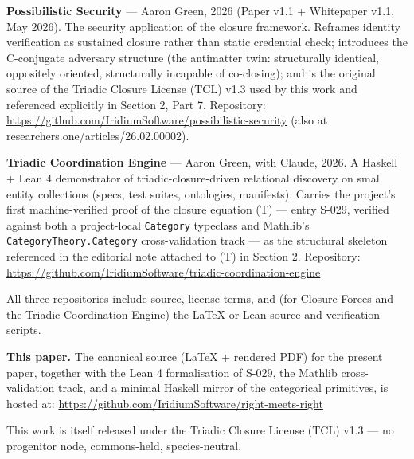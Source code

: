 \documentclass[
]{article}
\begin{document}
\textbf{Possibilistic Security} --- Aaron Green, 2026 (Paper v1.1
+ Whitepaper v1.1, May 2026). The security application of the
closure framework. Reframes identity verification as sustained
closure rather than static credential check; introduces the
C-conjugate adversary structure (the antimatter twin: structurally
identical, oppositely oriented, structurally incapable of
co-closing); and is the original source of the Triadic Closure
License (TCL) v1.3 used by this work and referenced explicitly in
Section 2, Part 7. Repository:
\url{https://github.com/IridiumSoftware/possibilistic-security}
(also at researchers.one/articles/26.02.00002).

\textbf{Triadic Coordination Engine} --- Aaron Green, with Claude,
2026. A Haskell + Lean 4 demonstrator of triadic-closure-driven
relational discovery on small entity collections (specs, test
suites, ontologies, manifests). Carries the project's first
machine-verified proof of the closure equation (T) --- entry
S-029, verified against both a project-local \texttt{Category}
typeclass and Mathlib's \texttt{CategoryTheory.Category}
cross-validation track --- as the structural skeleton referenced in
the editorial note attached to (T) in Section 2. Repository:
\url{https://github.com/IridiumSoftware/triadic-coordination-engine}

All three repositories include source, license terms, and (for
Closure Forces and the Triadic Coordination Engine) the LaTeX or
Lean source and verification scripts.

\textbf{This paper.} The canonical source (LaTeX + rendered PDF) for
the present paper, together with the Lean 4 formalisation of S-029,
the Mathlib cross-validation track, and a minimal Haskell mirror of
the categorical primitives, is hosted at:
\url{https://github.com/IridiumSoftware/right-meets-right}

This work is itself released under the Triadic Closure License (TCL)
v1.3 --- no progenitor node, commons-held, species-neutral.
\end{document}

